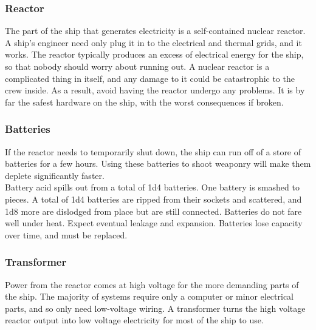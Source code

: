 \documentclass[a4paper]{article}
\begin{document}
\hspace{-18pt} \subsubsection{Reactor} \label{grid_reactor} \vspace{-0.2cm}
The part of the ship that generates electricity is a self-contained nuclear reactor. A ship's engineer need only plug it in to the electrical and thermal grids, and it works. The reactor typically produces an excess of electrical energy for the ship, so that nobody should worry about running out. A nuclear reactor is a complicated thing in itself, and any damage to it could be catastrophic to the crew inside. As a result, avoid having the reactor undergo any problems. It is by far the safest hardware on the ship, with the worst consequences if broken.

\vspace{-0.5cm} \hspace{-18pt} \subsubsection{Batteries} \label{grid_batteries} \vspace{-0.2cm}
If the reactor needs to temporarily shut down, the ship can run off of a store of batteries for a few hours. Using these batteries to shoot weaponry will make them deplete significantly faster.
\\ \pbhw
{Battery acid spills out from a total of 1d4 batteries.}
{One battery is smashed to pieces. A total of 1d4 batteries are ripped from their sockets and scattered, and 1d8 more are dislodged from place but are still connected.}
{Batteries do not fare well under heat. Expect eventual leakage and expansion.}
{Batteries lose capacity over time, and must be replaced.}


\vspace{-0.5cm} \hspace{-18pt} \subsubsection{Transformer} \label{grid_transformer} \vspace{-0.2cm}
Power from the reactor comes at high voltage for the more demanding parts of the ship. The majority of systems require only a computer or minor electrical parts, and so only need low-voltage wiring. A transformer turns the high voltage reactor output into low voltage electricity for most of the ship to use.
\end{document}

